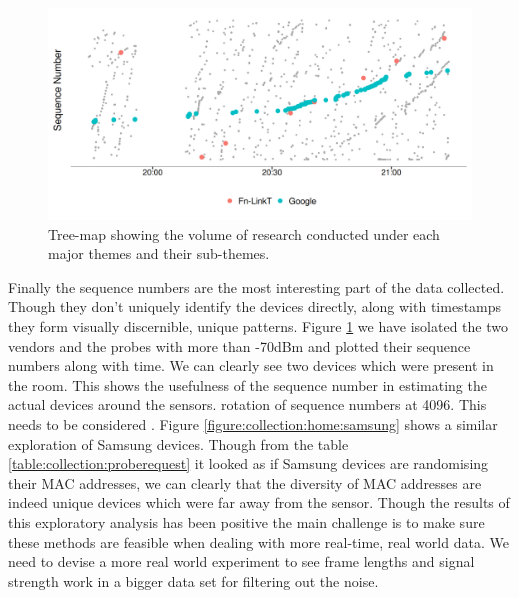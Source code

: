 \begin{figure}
  \includegraphics{images/home-sequence-time.png}
  \caption{Tree-map showing the volume of research conducted under each major themes and their sub-themes.}
  \label{figure:collection:home:sequence}
\end{figure}

Finally the sequence numbers are the most interesting part of the data collected. Though they don't uniquely identify the devices directly, along with timestamps they form visually discernible, unique patterns.
Figure \ref{figure:collection:home:sequence} we have isolated the two vendors and the probes with more than -70dBm and plotted their sequence numbers along with time. We can clearly see two devices which were present in the room. This shows the usefulness of the sequence number in estimating the actual devices around the sensors.
rotation of sequence numbers at 4096. This needs to be considered .
Figure \ref{figure:collection:home:samsung} shows a similar exploration of Samsung devices.
Though from the table \ref{table:collection:proberequest} it looked as if Samsung devices are randomising their MAC addresses, we can clearly that the diversity of MAC addresses are indeed unique devices which were far away from the sensor.
Though the results of this exploratory analysis has been positive the main challenge is to make sure these methods are feasible when dealing with more real-time, real world data.
We need to devise a more real world experiment to see frame lengths and signal strength work in a bigger data set for filtering out the noise. 

